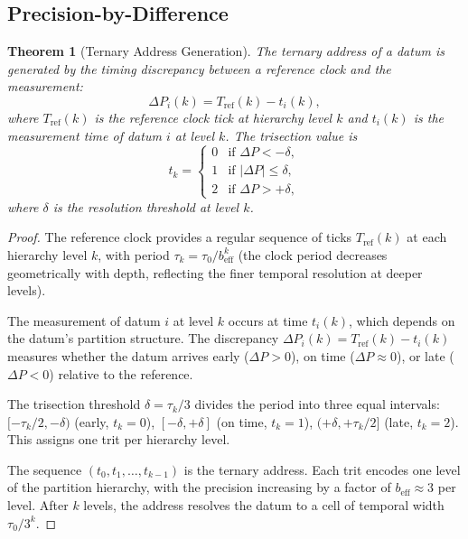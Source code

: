 \documentclass[twocolumn,10pt]{article}
\newtheorem{theorem}{Theorem}[section]
\theoremstyle{remark}
\newcommand{\beff}{b_{\mathrm{eff}}}
\begin{document}
\subsection{Precision-by-Difference}

\begin{theorem}[Ternary Address Generation]
\label{thm:precision_diff}
The ternary address of a datum is generated by the timing discrepancy between a reference clock and the measurement:
\begin{equation}
\Delta P_i(k) = T_{\mathrm{ref}}(k) - t_i(k),
\label{eq:precision_diff}
\end{equation}
where $T_{\mathrm{ref}}(k)$ is the reference clock tick at hierarchy level $k$ and $t_i(k)$ is the measurement time of datum $i$ at level $k$. The trisection value is
\begin{equation}
t_k = \begin{cases} 0 & \text{if } \Delta P < -\delta, \\ 1 & \text{if } |\Delta P| \leq \delta, \\ 2 & \text{if } \Delta P > +\delta, \end{cases}
\label{eq:trit_assign}
\end{equation}
where $\delta$ is the resolution threshold at level $k$.
\end{theorem}

\begin{proof}
The reference clock provides a regular sequence of ticks $T_{\mathrm{ref}}(k)$ at each hierarchy level $k$, with period $\tau_k = \tau_0 / \beff^k$ (the clock period decreases geometrically with depth, reflecting the finer temporal resolution at deeper levels).

The measurement of datum $i$ at level $k$ occurs at time $t_i(k)$, which depends on the datum's partition structure. The discrepancy $\Delta P_i(k) = T_{\mathrm{ref}}(k) - t_i(k)$ measures whether the datum arrives early ($\Delta P > 0$), on time ($\Delta P \approx 0$), or late ($\Delta P < 0$) relative to the reference.

The trisection threshold $\delta = \tau_k / 3$ divides the period into three equal intervals: $[-\tau_k/2, -\delta)$ (early, $t_k = 0$), $[-\delta, +\delta]$ (on time, $t_k = 1$), $(+\delta, +\tau_k/2]$ (late, $t_k = 2$). This assigns one trit per hierarchy level.

The sequence $(t_0, t_1, \ldots, t_{k-1})$ is the ternary address. Each trit encodes one level of the partition hierarchy, with the precision increasing by a factor of $\beff \approx 3$ per level. After $k$ levels, the address resolves the datum to a cell of temporal width $\tau_0 / 3^k$.
\end{proof}
\end{document}
